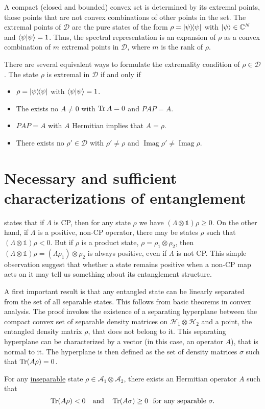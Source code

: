 \documentclass[a4paper]{report}
\DeclareMathOperator{\Imag}{Imag}
\begin{document}
A compact (closed and bounded) convex set is determined by its extremal points,
those points that are not convex combinations of other points in the set.
The extremal points of $\mathcal D$ are the pure states of the form
$\rho=\ketbra\psi$ with $\ket\psi\in\mathbb C^N$ and $\braket\psi=1$.
Thus, the spectral representation is an expansion of $\rho$ as a convex combination of $m$ extremal points in $\mathcal D$, where $m$ is the rank of $\rho$.

There are several equivalent ways to formulate the extremality condition of $\rho \in\mathcal D$.
The state $\rho$ is extremal in $\mathcal D$ if and only if
\begin{itemize}
	\item $\rho = \ketbra\psi$ with $\braket\psi=1$.
	\item The exists no $A\neq 0$ with $\Tr A=0$ and $PAP=A$.
	\item $PAP=A$ with $A$ Hermitian implies that $A=\rho$.
	\item There exists no $\rho'\in\mathcal D$ with $\rho'\neq\rho$ and $\Imag\rho'\neq\Imag\rho$.
\end{itemize}

\section{Necessary and sufficient characterizations of entanglement}
 states that if $\Lambda$ is \ac{CP},
then for any state $\rho$ we have $(\Lambda \otimes \mathds1)\rho \ge 0$.
On the other hand, if $\Lambda$ is a positive, non-\ac{CP} operator, there may be states $\rho$ such that
$(\Lambda \otimes \mathds1)\rho < 0$.
But if $\rho$ is a product state, $\rho = \rho_1 \otimes \rho_2$, then
$(\Lambda \otimes \mathds1)\rho = (\Lambda \rho_1) \otimes \rho_2$ is always positive,
even if $\Lambda$ is not \ac{CP}.
This simple observation suggest that whether a state remains positive when a non-\ac{CP} map acts on it may tell us something about its entanglement structure.

A first important result is that any entangled state can be linearly separated from the set of all separable states.
This follows from basic theorems in convex analysis.
The proof invokes the existence of a separating hyperplane between the compact convex set of separable density matrices on $\mathcal H_1 \otimes \mathcal H_2$ and a point,
the entangled density matrix $\rho$,
that does not belong to it.
This separating hyperplane can be characterized by a vector (in this case, an operator $A$),
that is normal to it.
The hyperplane is then defined as the set of density matrices $\sigma$ such that
$\Tr(A\rho) = 0$.
\begin{thm}
	For any \uline{inseparable} state $\rho \in \mathcal A_1 \otimes \mathcal A_2$,
	there exists an Hermitian operator $A$ such that
	\begin{equation}
		\Tr(A\rho) < 0
		\quad \text{and} \quad
		\Tr(A\sigma) \ge 0
		\,\, \text{ for any separable }\sigma.
	\end{equation}
\end{thm}
\end{document}
